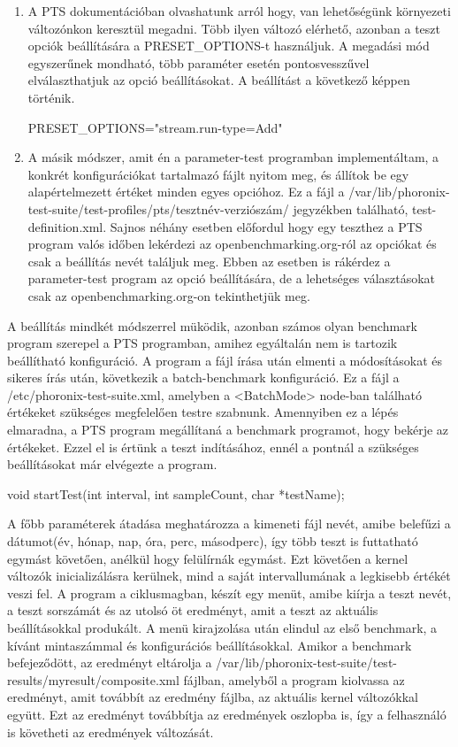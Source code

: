 \begin{enumerate}
\item A PTS dokumentációban olvashatunk arról hogy, van lehetőségünk környezeti változónkon keresztül megadni. Több ilyen változó elérhető, azonban a teszt opciók beállítására a PRESET\_OPTIONS-t használjuk. A megadási mód egyszerűnek mondható, több paraméter esetén pontosvesszűvel elválaszthatjuk az opció beállításokat. A beállítást a következő képpen történik.

PRESET\_OPTIONS="stream.run-type=Add" 
\item A másik módszer, amit én a parameter-test programban implementáltam, a konkrét konfigurációkat tartalmazó fájlt nyitom meg, és állítok be egy alapértelmezett értéket minden egyes opcióhoz. Ez a fájl a /var/lib/phoronix-test-suite/test-profiles/pts/tesztnév-verziószám/ jegyzékben található, test-definition.xml. Sajnos néhány esetben előfordul hogy egy teszthez a PTS program valós időben lekérdezi az openbenchmarking.org-ról az opciókat és csak a beállítás nevét találjuk meg. Ebben az esetben is rákérdez a parameter-test program az opció beállítására, de a lehetséges választásokat csak az openbenchmarking.org-on tekinthetjük meg. 
\end{enumerate}
A beállítás mindkét módszerrel müködik, azonban számos olyan benchmark program szerepel a PTS programban, amihez egyáltalán nem is tartozik beállítható konfiguráció. A program a fájl írása után elmenti a módosításokat és sikeres írás után, következik a batch-benchmark konfiguráció. 
Ez a fájl a /etc/phoronix-test-suite.xml, amelyben a <BatchMode> node-ban található értékeket szükséges megfelelően testre szabnunk. Amennyiben ez a lépés elmaradna, a PTS program megállítaná a benchmark programot, hogy bekérje az értékeket. Ezzel el is értünk a teszt indításához, ennél a pontnál a szükséges beállításokat már elvégezte a program.
\begin{cpp}
void startTest(int interval, int sampleCount, char *testName);
\end{cpp}
A főbb paraméterek átadása meghatározza a kimeneti fájl nevét, amibe belefűzi a dátumot(év, hónap, nap, óra, perc, másodperc), így több teszt is futtatható egymást követően, anélkül hogy felülírnák egymást.
Ezt követően a kernel változók inicializálásra kerülnek, mind a saját intervallumának a legkisebb értékét veszi fel. A program a ciklusmagban, készít egy menüt, amibe kiírja a teszt nevét, a teszt sorszámát és az utolsó öt eredményt, amit a teszt az aktuális beállításokkal produkált. A menü kirajzolása után elindul az első benchmark, a kívánt mintaszámmal és konfigurációs beállításokkal. Amikor a benchmark befejeződött, az eredményt eltárolja a /var/lib/phoronix-test-suite/test-results/myresult/composite.xml fájlban, amelyből a program kiolvassa az eredményt, amit továbbít az eredmény fájlba, az aktuális kernel változókkal együtt. Ezt az eredményt továbbítja az eredmények oszlopba is, így a felhasználó is követheti az eredmények változását.

